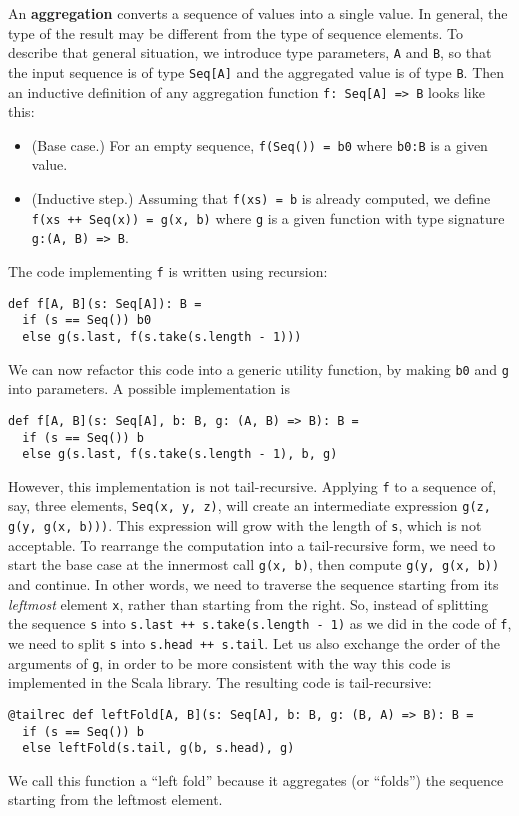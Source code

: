 An \textbf{aggregation} converts a sequence of
values into a single value. In general, the type of the result may
be different from the type of sequence elements. To describe that
general situation, we introduce type parameters, \lstinline!A! and
\lstinline!B!, so that the input sequence is of type \lstinline!Seq[A]!
and the aggregated value is of type \lstinline!B!. Then an inductive
definition of any aggregation function \lstinline!f: Seq[A] => B!
looks like this:
\begin{itemize}
\item (Base case.) For an empty sequence, \lstinline!f(Seq()) = b0! where
\lstinline!b0:B! is a given value.
\item (Inductive step.) Assuming that \lstinline!f(xs) = b! is already
computed, we define \lstinline!f(xs ++ Seq(x)) = g(x, b)! where \lstinline!g!
is a given function with type signature \lstinline!g:(A, B) => B!.
\end{itemize}
The code implementing \lstinline!f! is written using recursion:
\begin{lstlisting}
def f[A, B](s: Seq[A]): B =
  if (s == Seq()) b0
  else g(s.last, f(s.take(s.length - 1)))
\end{lstlisting}
We can now refactor this code into a generic utility function, by
making \lstinline!b0! and \lstinline!g! into parameters. A possible
implementation is
\begin{lstlisting}
def f[A, B](s: Seq[A], b: B, g: (A, B) => B): B =
  if (s == Seq()) b
  else g(s.last, f(s.take(s.length - 1), b, g)
\end{lstlisting}
However, this implementation is not tail-recursive. Applying \lstinline!f!
to a sequence of, say, three elements, \lstinline!Seq(x, y, z)!,
will create an intermediate expression \lstinline!g(z, g(y, g(x, b)))!.
This expression will grow with the length of \lstinline!s!, which
is not acceptable. To rearrange the computation into a tail-recursive
form, we need to start the base case at the innermost call \lstinline!g(x, b)!,
then compute \lstinline!g(y, g(x, b))! and continue. In other words,
we need to traverse the sequence starting from its \emph{leftmost}
element \lstinline!x!, rather than starting from the right. So, instead
of splitting the sequence \lstinline!s! into \lstinline!s.last ++ s.take(s.length - 1)!
as we did in the code of \lstinline!f!, we need to split \lstinline!s!
into \lstinline!s.head ++ s.tail!. Let us also exchange the order
of the arguments of \lstinline!g!, in order to be more consistent
with the way this code is implemented in the Scala library. The resulting
code is tail-recursive:
\begin{lstlisting}
@tailrec def leftFold[A, B](s: Seq[A], b: B, g: (B, A) => B): B =
  if (s == Seq()) b
  else leftFold(s.tail, g(b, s.head), g)
\end{lstlisting}
We call this function a ``left fold'' because it aggregates (or
``folds'') the sequence starting from the leftmost element.

